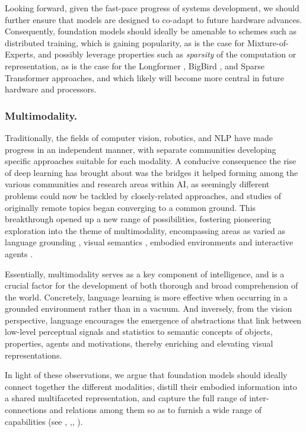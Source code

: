 Looking forward, given the fast-pace progress of systems development, we should further ensure that models are designed to co-adapt to future hardware advances. Consequently, foundation models should ideally be amenable to schemes such as distributed training, which is gaining popularity, as is the case for \eg Mixture-of-Experts, and possibly leverage properties such as \textit{sparsity} of the computation or representation, as is the case for the Longformer \citep{longformer}, BigBird \citep{bigbird}, and Sparse Transformer \citep{child2019generating} approaches, and which likely will become more central in future hardware and processors.

\subsubsection{Multimodality.} Traditionally, the fields of computer vision, robotics, and NLP have made progress in an independent manner, with separate communities developing specific approaches suitable for each modality. A conducive consequence the rise of deep learning has brought about was the bridges it helped forming among the various communities and research areas within AI, as seemingly different problems could now be tackled by closely-related approaches, and studies of originally remote topics began converging to a common ground. This breakthrough opened up a new range of possibilities, fostering pioneering exploration into the theme of multimodality, encompassing  areas as varied as language grounding \citep{lynch2020grounding}, visual semantics \citep{conser2019revisiting},  embodied environments \citep{embodied} and interactive agents \citep{interactive}.

Essentially, multimodality serves as a key component of intelligence, and is a crucial factor for the development of both thorough and broad comprehension of the world. Concretely, language learning is more effective when occurring in a grounded environment rather than in a vacuum. And inversely, from the vision perspective, language encourages the emergence of abstractions that link between low-level perceptual signals and statistics to semantic concepts of objects, properties, agents and motivations, thereby enriching and elevating visual representations. 

In light of these observations, we argue that foundation models should ideally connect together the different modalities, distill their embodied information into a shared multifaceted representation, and capture the full range of inter-connections and relations among them so as  to furnish a wide range of capabilities (see ,  ,, ).

